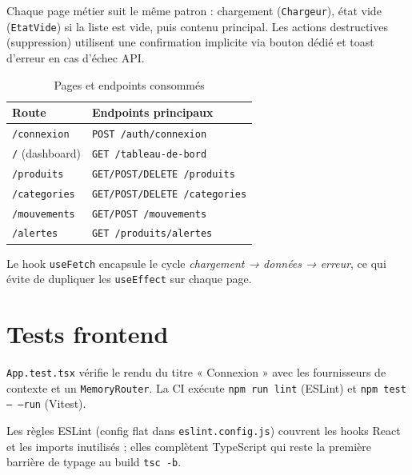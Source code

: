 Chaque page métier suit le même patron : chargement (\texttt{Chargeur}), état vide (\texttt{EtatVide}) si la liste est vide, puis contenu principal. Les actions destructives (suppression) utilisent une confirmation implicite via bouton dédié et toast d'erreur en cas d'échec API.

\begin{table}[htbp]
  \centering
  \caption{Pages et endpoints consommés}
  \label{tab:frontend-pages}
  \small
  \begin{tabular}{@{}ll@{}}
    \toprule
    \textbf{Route} & \textbf{Endpoints principaux} \\
    \midrule
    \texttt{/connexion} & \texttt{POST /auth/connexion} \\
    \texttt{/} (dashboard) & \texttt{GET /tableau-de-bord} \\
    \texttt{/produits} & \texttt{GET/POST/DELETE /produits} \\
    \texttt{/categories} & \texttt{GET/POST/DELETE /categories} \\
    \texttt{/mouvements} & \texttt{GET/POST /mouvements} \\
    \texttt{/alertes} & \texttt{GET /produits/alertes} \\
    \bottomrule
  \end{tabular}
\end{table}

Le hook \texttt{useFetch} encapsule le cycle \emph{chargement → données → erreur}, ce qui évite de dupliquer les \texttt{useEffect} sur chaque page.

\section{Tests frontend}

\texttt{App.test.tsx} vérifie le rendu du titre « Connexion » avec les fournisseurs de contexte et un \texttt{MemoryRouter}. La CI exécute \texttt{npm run lint} (ESLint) et \texttt{npm test -- --run} (Vitest).

Les règles ESLint (config flat dans \texttt{eslint.config.js}) couvrent les hooks React et les imports inutilisés ; elles complètent TypeScript qui reste la première barrière de typage au build \texttt{tsc -b}.
